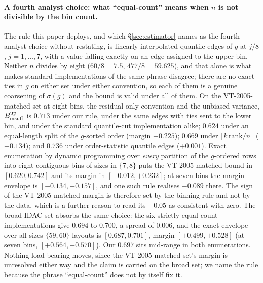 \paragraph{A fourth analyst choice: what ``equal-count'' means when $n$ is not divisible by the bin
count.} The rule this paper deploys, and which \S\ref{sec:estimator} names as the fourth analyst choice
without restating, is linearly interpolated quantile edges of $g$ at
$j/8$, $j=1,\dots,7$, with a value falling exactly on an edge assigned to the upper bin.
Neither $n$ divides by eight ($60/8=7.5$, $477/8=59.625$), and that alone is what makes standard
implementations of the same phrase disagree; there are no exact ties in $g$ on either set under
either convention, so each of them is a genuine coarsening of $\sigma(g)$ and the bound is valid
under all of them. On the VT-2005-matched set at eight bins, the residual-only convention and the unbiased variance,
$B_{\mathrm{insuff}}^{\mathrm{up}}$ is $0.713$ under our rule, under the same edges with ties sent to the lower
bin, and under the standard quantile-cut implementation alike; $0.624$ under an equal-length split of the
$g$-sorted order (margin $+0.225$); $0.669$ under $\lfloor k\,\mathrm{rank}/n\rfloor$ ($+0.134$); and
$0.736$ under order-statistic quantile edges ($+0.001$). Exact enumeration by dynamic programming
over \emph{every} partition of the $g$-ordered rows into eight contiguous bins of sizes in
$\{7,8\}$ puts the VT-2005-matched bound in $[0.620,0.742]$ and its margin in $[-0.012,+0.232]$; at seven bins
the margin envelope is $[-0.134,+0.157]$, and one such rule realises $-0.089$ there. The sign of the
VT-2005-matched margin is therefore set by the binning rule and not by the data, which is a further reason to
read its $+0.05$ as consistent with zero. The broad IDAC set absorbs the same choice: the six
strictly equal-count implementations give $0.694$ to $0.700$, a spread of $0.006$, and the exact
envelope over all sizes-$\{59,60\}$ layouts is $[0.687,0.701]$, margin $[+0.499,+0.528]$ (at seven
bins, $[+0.564,+0.570]$). Our $0.697$ sits mid-range in both enumerations. Nothing load-bearing
moves, since the VT-2005-matched set's margin is unresolved either way and the claim is carried on the broad set;
we name the rule because the phrase ``equal-count'' does not by itself fix it.

